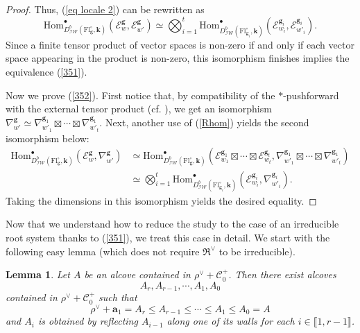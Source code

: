 \documentclass[11pt]{amsart}
\theoremstyle{plain}
\newtheorem{lem}[thm]{Lemma}
\theoremstyle{remark}
\numberwithin{equation}{section}
\begin{document}
\begin{proof}
		Thus, (\ref{eq locale 2}) can be rewritten as  
		$$\mathrm{Hom}_{D^b_{\mathcal{IW}}(\mathrm{Fl}^{\circ}_{\mathbf{g}},\mathbf{k}) }^\bullet(\mathcal{E}_{w}^{\mathbf{g}},\mathcal{E}_{w'}^{\mathbf{g}})\simeq \bigotimes_{i=1}^t\mathrm{Hom}_{D^b_{\mathcal{IW}}(\mathrm{Fl}^{\circ}_{\mathbf{g}_i},\mathbf{k})}^\bullet(\mathcal{E}_{w_i}^{\mathbf{g}_i},\mathcal{E}_{w'_i}^{\mathbf{g}_i}). $$
		Since a finite tensor product of vector spaces is non-zero if and only if each vector space appearing in the product is non-zero, this isomorphism finishes implies the equivalence (\ref{351}).
		
		Now we prove (\ref{352}). First notice that, by compatibility of the $*$-pushforward with the external tensor product (cf. \cite[§4.2.7(a)]{beilinson2018faisceaux}), we get an isomorphism $\nabla_{w'}^{\mathbf{g}}\simeq \nabla_{w'_1}^{\mathbf{g}_1}\boxtimes\cdots\boxtimes\nabla_{w'_t}^{\mathbf{g}_1}$. Next, another use of (\ref{Rhom}) yields  the second isomorphism below:
		\begin{align*}
			\mathrm{Hom}_{D^b_{\mathcal{IW}}(\mathrm{Fl}^{\circ}_{\mathbf{g}},\mathbf{k}) }^\bullet(\mathcal{E}_{w}^{\mathbf{g}},\nabla_{w'}^\mathbf{g})&\simeq\mathrm{Hom}_{D^b_{\mathcal{IW}}(\mathrm{Fl}^{\circ}_{\mathbf{g}},\mathbf{k}) }^\bullet(\mathcal{E}_{w_1}^{\mathbf{g}_1}\boxtimes\cdots \boxtimes\mathcal{E}_{w_t}^{\mathbf{g}_t},\nabla_{w'_1}^{\mathbf{g}_1}\boxtimes\cdots\boxtimes\nabla_{w'_t}^{\mathbf{g}_1})\\&\simeq \bigotimes_{i=1}^t\mathrm{Hom}_{D^b_{\mathcal{IW}}(\mathrm{Fl}^{\circ}_{\mathbf{g}_i},\mathbf{k})}^\bullet(\mathcal{E}_{w_i}^{\mathbf{g}_i},\nabla_{w'_i}^{\mathbf{g}_i}). 
		\end{align*}
		Taking the dimensions in this isomorphism yields the desired equality.
	\end{proof}
	Now that we understand how to reduce the study to the case of an irreducible root system thanks to (\ref{351}), we treat this case in detail. We start with the following easy lemma (which does not require $\mathfrak{R}^\vee$ to be irreducible).
	\begin{lem}\label{descent}	
		Let $A$ be an alcove contained in  $\rho^\vee+\mathscr{C}^+_0$. Then there exist alcoves $$A_r,A_{r-1},\cdots,A_1,A_0$$ contained in $\rho^\vee+\mathscr{C}^+_0$ such that 
		$$\rho^\vee+\mathbf{a}_1=A_r\leq A_{r-1}\leq\cdots\leq A_1\leq A_0=A$$
		and $A_i$ is obtained by reflecting $A_{i-1}$ along one of its walls for each $i\in\llbracket1,r-1\rrbracket$.
	\end{lem}
\end{document}
